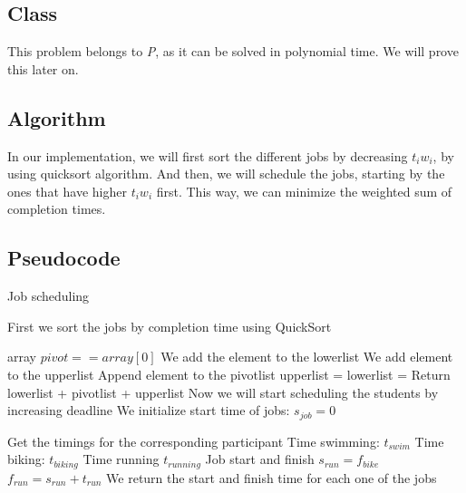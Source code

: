 \documentclass{article}
\begin{document}
\subsection*{Class}

This problem belongs to \textit{P}, as it can be solved in polynomial time. We will prove this later on.

\subsection*{Algorithm}

In our implementation, we will first sort the different jobs by decreasing $t_i w_i$, by using quicksort algorithm. And then, we will schedule the jobs, starting by the ones that have higher $t_i w_i$ first. This way, we can minimize the weighted sum of completion times.

\subsection*{Pseudocode}

\begin{algorithm}[H]
\caption{Job scheduling}
\begin{algorithmic}[1]
\State First we sort the jobs by completion time using QuickSort

  \Return array
 \EndIf
  \State $pivot == array[0]$
    \State We add the element to the lowerlist
   \EndIf
    \State We add element to the upperlist
   \EndIf
    \State Append element to the pivotlist
   \EndIf
  \EndFor
  \State upperlist = 
  \State lowerlist = 
 \EndIf
 \State Return lowerlist + pivotlist + upperlist
\EndFunction
\State
\State Now we will start scheduling the students by increasing deadline
\State We initialize start time of jobs: $s_{job} = 0$

 \State Get the timings for the corresponding participant
 \State Time swimming: $t_{swim}$
 \State Time biking: $t_{biking}$
 \State Time running $t_{running}$
 \State
 \State Job start and finish
 \State $s_{run} = f_{bike}$
 \State $f_{run} = s_{run} + t_{run}$
 \State
 \State We return the start and finish time for each one of the jobs

\EndWhile
\end{algorithmic}
\end{algorithm}
\end{document}
